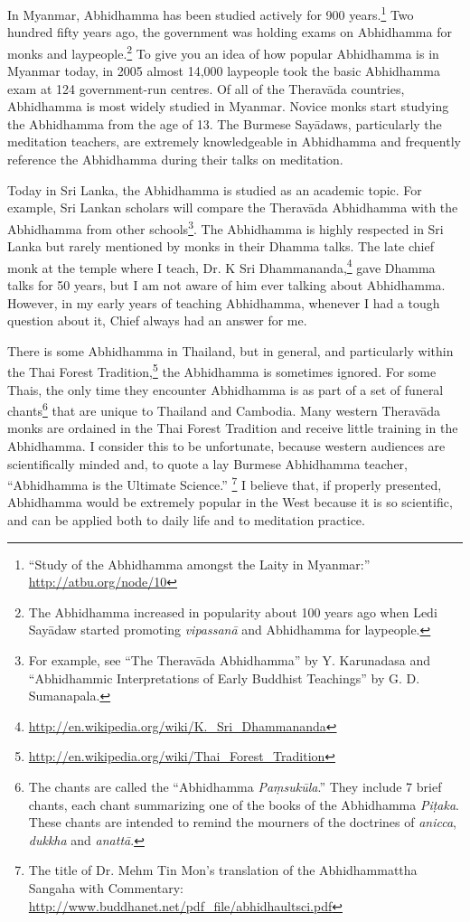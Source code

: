 In Myanmar, Abhidhamma has been studied actively for 900 years.\footnote{“Study of the Abhidhamma amongst the Laity in Myanmar:” \url{http://atbu.org/node/10}} Two hundred fifty years ago, the government was holding exams on Abhidhamma for monks and laypeople.\footnote{The Abhidhamma increased in popularity about 100 years ago when Ledi Sayādaw started promoting \textit{vipassanā} and Abhidhamma for laypeople.} To give you an idea of how popular Abhidhamma is in Myanmar today, in 2005 almost 14,000 laypeople took the basic Abhidhamma exam at 124 government-run centres. Of all of the Theravāda countries, Abhidhamma is most widely studied in Myanmar. Novice monks start studying the Abhidhamma from the age of 13. The Burmese Sayādaws, particularly the meditation teachers, are extremely knowledgeable in Abhidhamma and frequently reference the Abhidhamma during their talks on meditation.

Today in Sri Lanka, the Abhidhamma is studied as an academic topic. For example, Sri Lankan scholars will compare the Theravāda Abhidhamma with the Abhidhamma from other schools\footnote{For example, see “The Theravāda Abhidhamma” by Y. Karunadasa and “Abhidhammic Interpretations of Early Buddhist Teachings” by G. D. Sumanapala.}. The Abhidhamma is highly respected in Sri Lanka but rarely mentioned by monks in their Dhamma talks. The late chief monk at the temple where I teach, Dr. K Sri Dhammananda,\footnote{\url{http://en.wikipedia.org/wiki/K._Sri_Dhammananda}} gave Dhamma talks for 50 years, but I am not aware of him ever talking about Abhidhamma. However, in my early years of teaching Abhidhamma, whenever I had a tough question about it, Chief always had an answer for me.

\pagebreak

There is some Abhidhamma in Thailand, but in general, and particularly within the Thai Forest Tradition,\footnote{\url{http://en.wikipedia.org/wiki/Thai_Forest_Tradition}} the Abhidhamma is sometimes ignored. For some Thais, the only time they encounter Abhidhamma is as part of a set of funeral chants\footnote{The chants are called the “Abhidhamma \textit{Paṃsukūla}.” They include 7 brief chants, each chant summarizing one of the books of the Abhidhamma \textit{Piṭaka}. These chants are intended to remind the mourners of the doctrines of \textit{anicca}, \textit{dukkha} and \textit{anattā}.} that are unique to Thailand and Cambodia. Many western Theravāda monks are ordained in the Thai Forest Tradition and receive little training in the Abhidhamma. I consider this to be unfortunate, because western audiences are scientifically minded and, to quote a lay Burmese Abhidhamma teacher, “Abhidhamma is the Ultimate Science.” \footnote{The title of Dr. Mehm Tin Mon’s translation of the Abhidhammattha Sangaha with Commentary: \url{http://www.buddhanet.net/pdf_file/abhidhaultsci.pdf}} I believe that, if properly presented, Abhidhamma would be extremely popular in the West because it is so scientific, and can be applied both to daily life and to meditation practice.

